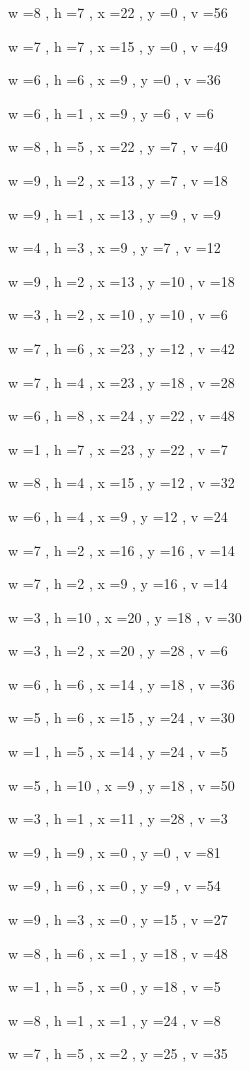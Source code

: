 \documentclass[11pt]{article}
\begin{document}
w =8 , h =7 , x =22 , y =0 , v =56
\par
w =7 , h =7 , x =15 , y =0 , v =49
\par
w =6 , h =6 , x =9 , y =0 , v =36
\par
w =6 , h =1 , x =9 , y =6 , v =6
\par
w =8 , h =5 , x =22 , y =7 , v =40
\par
w =9 , h =2 , x =13 , y =7 , v =18
\par
w =9 , h =1 , x =13 , y =9 , v =9
\par
w =4 , h =3 , x =9 , y =7 , v =12
\par
w =9 , h =2 , x =13 , y =10 , v =18
\par
w =3 , h =2 , x =10 , y =10 , v =6
\par
w =7 , h =6 , x =23 , y =12 , v =42
\par
w =7 , h =4 , x =23 , y =18 , v =28
\par
w =6 , h =8 , x =24 , y =22 , v =48
\par
w =1 , h =7 , x =23 , y =22 , v =7
\par
w =8 , h =4 , x =15 , y =12 , v =32
\par
w =6 , h =4 , x =9 , y =12 , v =24
\par
w =7 , h =2 , x =16 , y =16 , v =14
\par
w =7 , h =2 , x =9 , y =16 , v =14
\par
w =3 , h =10 , x =20 , y =18 , v =30
\par
w =3 , h =2 , x =20 , y =28 , v =6
\par
w =6 , h =6 , x =14 , y =18 , v =36
\par
w =5 , h =6 , x =15 , y =24 , v =30
\par
w =1 , h =5 , x =14 , y =24 , v =5
\par
w =5 , h =10 , x =9 , y =18 , v =50
\par
w =3 , h =1 , x =11 , y =28 , v =3
\par
w =9 , h =9 , x =0 , y =0 , v =81
\par
w =9 , h =6 , x =0 , y =9 , v =54
\par
w =9 , h =3 , x =0 , y =15 , v =27
\par
w =8 , h =6 , x =1 , y =18 , v =48
\par
w =1 , h =5 , x =0 , y =18 , v =5
\par
w =8 , h =1 , x =1 , y =24 , v =8
\par
w =7 , h =5 , x =2 , y =25 , v =35
\par
\newpage
\end{document}
